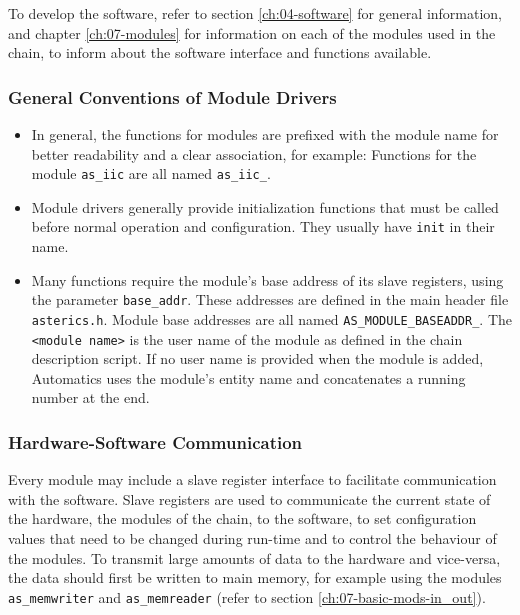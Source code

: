 To develop the software, refer to section \ref{ch:04-software} for general information, and chapter \ref{ch:07-modules} for information on each of the modules used in the chain, to inform about the software interface and functions available.

\subsubsection{General Conventions of Module Drivers}

\begin{itemize}
\item In general, the functions for modules are prefixed with the module name for better readability and a clear association, for example: Functions for the module \texttt{as\_iic} are all named \texttt{as\_iic\_<function name>}.
\item Module drivers generally provide initialization functions that must be called before normal operation and configuration. They usually have \texttt{init} in their name.
\item Many functions require the module's base address of its slave registers, using the parameter \texttt{base\_addr}.
These addresses are defined in the main header file \texttt{asterics.h}.
Module base addresses are all named \texttt{AS\_MODULE\_BASEADDR\_<module name>}.
The \texttt{<module name>} is the user name of the module as defined in the chain description script.
If no user name is provided when the module is added, Automatics uses the module's entity name and concatenates a running number at the end.
\end{itemize}


\subsubsection{Hardware-Software Communication}

Every \asterics module may include a slave register interface to facilitate communication with the software.
Slave registers are used to communicate the current state of the hardware, the modules of the \asterics chain, to the software, to set configuration values that need to be changed during run-time and to control the behaviour of the modules.
To transmit large amounts of data to the hardware and vice-versa, the data should first be written to main memory, for example using the modules \texttt{as\_memwriter} and \texttt{as\_memreader} (refer to section \ref{ch:07-basic-mods-in_out}).

